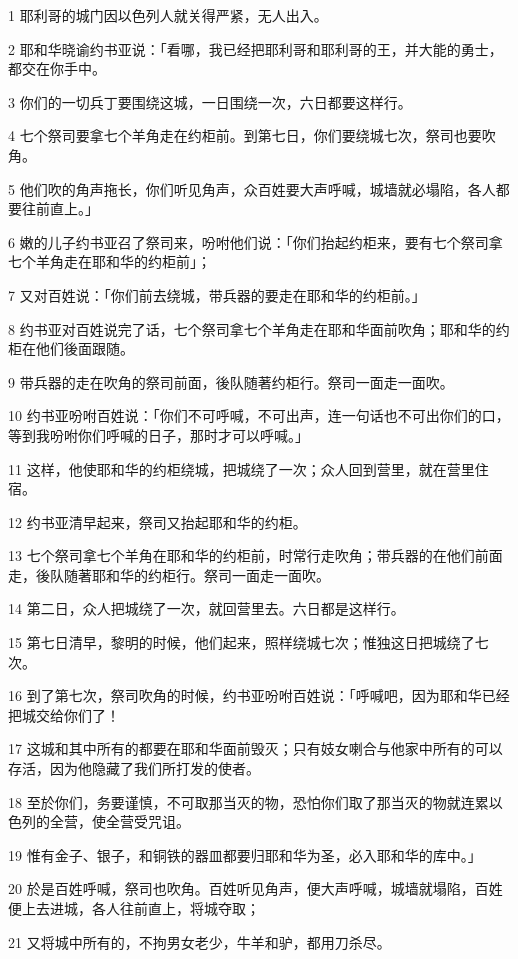 \par 1 耶利哥的城门因以色列人就关得严紧，无人出入。
\par 2 耶和华晓谕约书亚说：「看哪，我已经把耶利哥和耶利哥的王，并大能的勇士，都交在你手中。
\par 3 你们的一切兵丁要围绕这城，一日围绕一次，六日都要这样行。
\par 4 七个祭司要拿七个羊角走在约柜前。到第七日，你们要绕城七次，祭司也要吹角。
\par 5 他们吹的角声拖长，你们听见角声，众百姓要大声呼喊，城墙就必塌陷，各人都要往前直上。」
\par 6 嫩的儿子约书亚召了祭司来，吩咐他们说：「你们抬起约柜来，要有七个祭司拿七个羊角走在耶和华的约柜前」；
\par 7 又对百姓说：「你们前去绕城，带兵器的要走在耶和华的约柜前。」
\par 8 约书亚对百姓说完了话，七个祭司拿七个羊角走在耶和华面前吹角；耶和华的约柜在他们後面跟随。
\par 9 带兵器的走在吹角的祭司前面，後队随著约柜行。祭司一面走一面吹。
\par 10 约书亚吩咐百姓说：「你们不可呼喊，不可出声，连一句话也不可出你们的口，等到我吩咐你们呼喊的日子，那时才可以呼喊。」
\par 11 这样，他使耶和华的约柜绕城，把城绕了一次；众人回到营里，就在营里住宿。
\par 12 约书亚清早起来，祭司又抬起耶和华的约柜。
\par 13 七个祭司拿七个羊角在耶和华的约柜前，时常行走吹角；带兵器的在他们前面走，後队随著耶和华的约柜行。祭司一面走一面吹。
\par 14 第二日，众人把城绕了一次，就回营里去。六日都是这样行。
\par 15 第七日清早，黎明的时候，他们起来，照样绕城七次；惟独这日把城绕了七次。
\par 16 到了第七次，祭司吹角的时候，约书亚吩咐百姓说：「呼喊吧，因为耶和华已经把城交给你们了！
\par 17 这城和其中所有的都要在耶和华面前毁灭；只有妓女喇合与他家中所有的可以存活，因为他隐藏了我们所打发的使者。
\par 18 至於你们，务要谨慎，不可取那当灭的物，恐怕你们取了那当灭的物就连累以色列的全营，使全营受咒诅。
\par 19 惟有金子、银子，和铜铁的器皿都要归耶和华为圣，必入耶和华的库中。」
\par 20 於是百姓呼喊，祭司也吹角。百姓听见角声，便大声呼喊，城墙就塌陷，百姓便上去进城，各人往前直上，将城夺取；
\par 21 又将城中所有的，不拘男女老少，牛羊和驴，都用刀杀尽。

